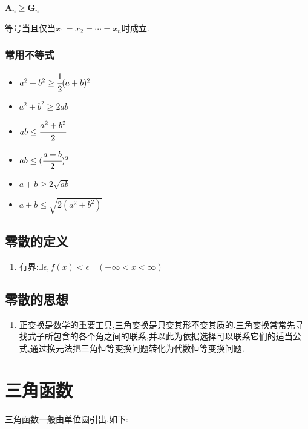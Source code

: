 \documentclass[UTF8,12pt]{ctexbook}
\begin{document}
{{{{  \begin{center}
    $\mathbf{A}_n\geq\mathbf{G}_n$
  \end{center}

  等号当且仅当$x_1 = x_2 = \dotsm = x_n$时成立.

}%

\subsubsection{常用不等式}{
  \begin{itemize}
    \item $a^2 + b^2 \geq \cfrac{1}{2}(a + b)^2$
    \item $a^2 + b^2 \geq 2ab$
    \item $ab \leq \cfrac{a^2 + b^2}{2}$
    \item $ab \leq (\cfrac{a + b}{2})^2$
    \item $a + b \geq 2\sqrt{ab}$
    \item $a + b \leq \sqrt{2(a^2 + b^2)}$
  \end{itemize}
}%

}%

\subsection{零散的定义}{
  \begin{enumerate}
    \item 有界:$\exists\epsilon,f(x) < \epsilon\quad(-\infty < x < \infty )$
  \end{enumerate}
}%

\subsection{零散的思想}{
  \begin{enumerate}
    \item 正变换是数学的重要工具,三角变换是只变其形不变其质的.三角变换常常先寻找式子所包含的各个角之间的联系,并以此为依据选择可以联系它们的适当公式,通过换元法把三角恒等变换问题转化为代数恒等变换问题.
  \end{enumerate}
}%

}%

\section{三角函数}{
三角函数一般由单位圆引出,如下:

}}
\end{document}
